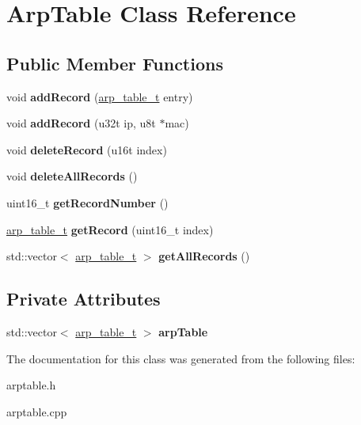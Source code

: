 \hypertarget{classArpTable}{}\section{Arp\+Table Class Reference}
\label{classArpTable}
\subsection*{Public Member Functions}
\begin{DoxyCompactItemize}
\item 
\mbox{\label{classArpTable_a73005ba2b1e7a304ca8e52fc248fa088}} 
void {\bfseries add\+Record} (\hyperlink{structarp__table__t}{arp\+\_\+table\+\_\+t} entry)
\item 
\mbox{\label{classArpTable_a50ff8a76494c612b9d9a3e0959a22319}} 
void {\bfseries add\+Record} (u32t ip, u8t $\ast$mac)
\item 
\mbox{\label{classArpTable_a82253f8a60a10ccf891523af60127107}} 
void {\bfseries delete\+Record} (u16t index)
\item 
\mbox{\label{classArpTable_a2caff3ffc36cabf9a3bfc08791fc54c3}} 
void {\bfseries delete\+All\+Records} ()
\item 
\mbox{\label{classArpTable_a7ccaac9af85787a5d0ac606e7f35d68c}} 
uint16\+\_\+t {\bfseries get\+Record\+Number} ()
\item 
\mbox{\label{classArpTable_a74f045fa2052bfd3d54a61369862e434}} 
\hyperlink{structarp__table__t}{arp\+\_\+table\+\_\+t} {\bfseries get\+Record} (uint16\+\_\+t index)
\item 
\mbox{\label{classArpTable_ae546c9a5a0a1711caa273c62840cc04c}} 
std\+::vector$<$ \hyperlink{structarp__table__t}{arp\+\_\+table\+\_\+t} $>$ {\bfseries get\+All\+Records} ()
\end{DoxyCompactItemize}
\subsection*{Private Attributes}
\begin{DoxyCompactItemize}
\item 
\mbox{\label{classArpTable_a81b942abf2c4e35ca7790939595f59b3}} 
std\+::vector$<$ \hyperlink{structarp__table__t}{arp\+\_\+table\+\_\+t} $>$ {\bfseries arp\+Table}
\end{DoxyCompactItemize}


The documentation for this class was generated from the following files\+:\begin{DoxyCompactItemize}
\item 
arptable.\+h\item 
arptable.\+cpp\end{DoxyCompactItemize}
